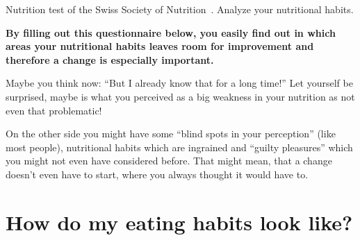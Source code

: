 \documentclass[../main.tex]{subfiles}
\begin{document}
Nutrition test of the Swiss Society of Nutrition~\cite{SGE}. Analyze your nutritional habits.

\vspace{5mm}

\textbf{By filling out this questionnaire below, you easily find out in which areas your nutritional habits leaves room for improvement
  and therefore a change is especially important.}

\vspace{5mm}

Maybe you think now: ``But I already know that for a long time!''
Let yourself be surprised, maybe is what you perceived as a big weakness in your nutrition as not even that problematic!

On the other side you might have some ``blind spots in your perception'' (like most people),
nutritional habits which are ingrained and ``guilty pleasures'' which you might not even have considered before.
That might mean, that a change doesn't even have to start, where you always thought it would have to.

\newpage

\section{How do my eating habits look like?}

\vspace{5mm}
\end{document}
